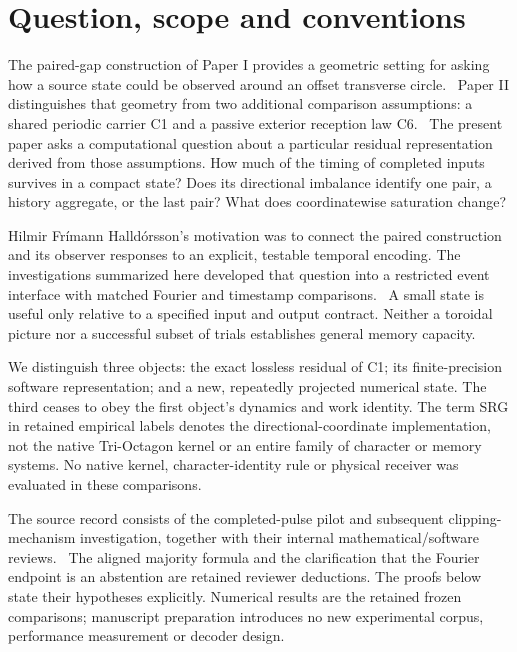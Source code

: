 \section{Question, scope and conventions}\label{sec:scope}
The paired-gap construction of Paper I provides a geometric setting for asking how a source state could be observed around an offset transverse circle.~\cite{PaperI} Paper II distinguishes that geometry from two additional comparison assumptions: a shared periodic carrier C1 and a passive exterior reception law C6.~\cite{PaperII} The present paper asks a computational question about a particular residual representation derived from those assumptions. How much of the timing of completed inputs survives in a compact state? Does its directional imbalance identify one pair, a history aggregate, or the last pair? What does coordinatewise saturation change?

Hilmir Frímann Halldórsson's motivation was to connect the paired construction and its observer responses to an explicit, testable temporal encoding. The investigations summarized here developed that question into a restricted event interface with matched Fourier and timestamp comparisons.~\cite{Pilot,Mechanism} A small state is useful only relative to a specified input and output contract. Neither a toroidal picture nor a successful subset of trials establishes general memory capacity.

We distinguish three objects: the exact lossless residual of C1; its finite-precision software representation; and a new, repeatedly projected numerical state. The third ceases to obey the first object's dynamics and work identity. The term SRG in retained empirical labels denotes the directional-coordinate implementation, not the native Tri-Octagon kernel or an entire family of character or memory systems. No native kernel, character-identity rule or physical receiver was evaluated in these comparisons.

The source record consists of the completed-pulse pilot and subsequent clipping-mechanism investigation, together with their internal mathematical/software reviews.~\cite{Pilot,Review09,Mechanism,Review10} The aligned majority formula and the clarification that the Fourier endpoint is an abstention are retained reviewer deductions. The proofs below state their hypotheses explicitly. Numerical results are the retained frozen comparisons; manuscript preparation introduces no new experimental corpus, performance measurement or decoder design.

